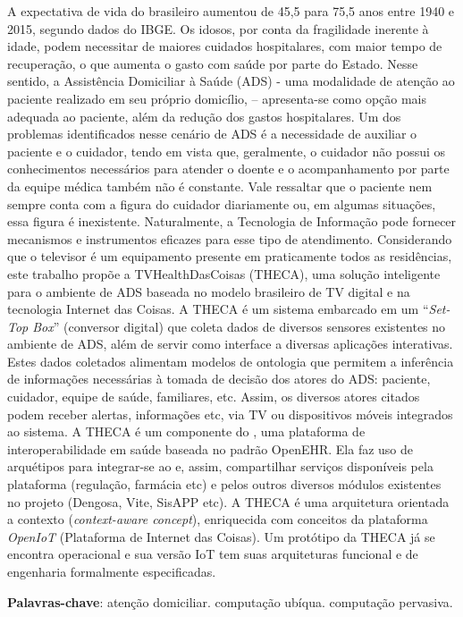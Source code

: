 \setlength{\absparsep}{18pt} %
\begin{resumo}

A expectativa de vida do brasileiro aumentou de 45,5 para 75,5 anos entre 1940 e
2015, segundo dados do IBGE. Os idosos, por conta da fragilidade inerente à
idade, podem necessitar de maiores cuidados hospitalares, com maior tempo de
recuperação, o que aumenta o gasto com saúde por parte do Estado. Nesse sentido,
a Assistência Domiciliar à Saúde (ADS) - uma modalidade de atenção ao paciente
realizado em seu próprio domicílio, – apresenta-se como opção mais adequada ao
paciente, além da redução dos gastos hospitalares. Um dos problemas
identificados nesse cenário de ADS é a necessidade de auxiliar o paciente e o
cuidador, tendo em vista que, geralmente, o cuidador não possui os conhecimentos
necessários para atender o doente e o acompanhamento por parte da equipe médica
também não é  constante. Vale ressaltar que o paciente nem sempre conta com a
figura do cuidador diariamente ou, em algumas situações, essa figura é
inexistente. Naturalmente, a Tecnologia de Informação pode fornecer mecanismos e
instrumentos eficazes para esse tipo de atendimento. Considerando que o
televisor é um equipamento presente em praticamente todos as residências, este
trabalho propõe a TVHealthDasCoisas (THECA), uma solução inteligente para o
ambiente de ADS baseada no modelo brasileiro de TV digital e na tecnologia
Internet das Coisas. A THECA é um sistema embarcado em um ``\textit{Set-Top
Box}'' (conversor digital) que coleta dados de diversos sensores existentes no
ambiente de ADS, além de servir como interface a diversas aplicações
interativas. Estes dados coletados alimentam modelos de ontologia que permitem a
inferência de informações necessárias à tomada de decisão dos atores do ADS:
paciente, cuidador, equipe de saúde, familiares, etc. Assim, os diversos atores
citados podem receber alertas, informações etc, via TV ou dispositivos móveis
integrados ao sistema. A THECA é um componente do \nextsaude[], uma plataforma de
interoperabilidade em saúde baseada no padrão OpenEHR. Ela faz uso de arquétipos
para integrar-se ao \nextsaude[] e, assim, compartilhar serviços disponíveis pela
plataforma (regulação, farmácia etc) e pelos outros diversos módulos existentes
no projeto (Dengosa, Vite, SisAPP etc). A THECA é uma arquitetura orientada a
contexto (\textit{context-aware concept}), enriquecida com conceitos da
plataforma \textit{OpenIoT} (Plataforma de Internet das Coisas). Um protótipo da
THECA já se encontra operacional e sua versão IoT tem suas arquiteturas
funcional e de engenharia formalmente especificadas.

 \textbf{Palavras-chave}: atenção domiciliar. computação ubíqua. computação pervasiva.
 \end{resumo}
